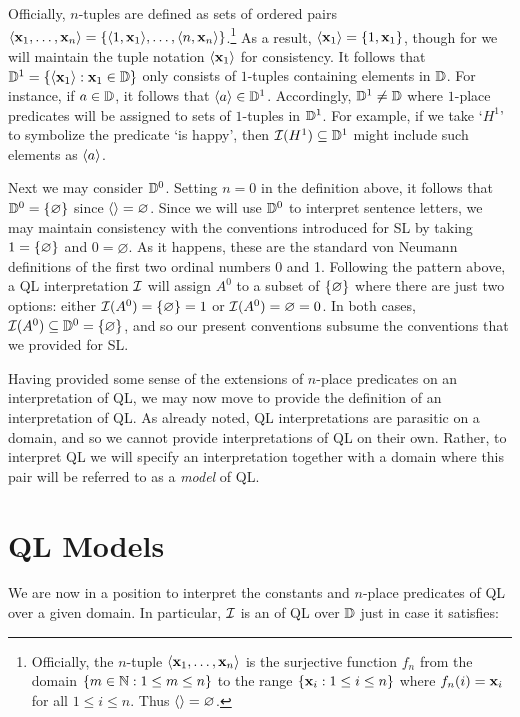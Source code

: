 Officially, $n$-tuples are defined as sets of ordered pairs $\langle\mathbf{x}_1,\ldots,\mathbf{x}_n\rangle=\lbrace\langle1,\mathbf{x}_1\rangle,\ldots,\langle n,\mathbf{x}_n\rangle\rbrace$.\footnote{Officially, the $n$-tuple $\langle\mathbf{x}_1,\ldots,\mathbf{x}_n\rangle$ is the surjective function $f_n$ from the domain $\lbrace m\in\mathbb{N}:1\leq m\leq n\rbrace$ to the range $\lbrace\mathbf{x}_i:1\leq i\leq n\rbrace$ where $f_n(i)=\mathbf{x}_i$ for all $1\leq i\leq n$. Thus $\langle\rangle=\varnothing$.}
As a result, $\langle\mathbf{x}_1\rangle=\lbrace1,\mathbf{x}_1\rbrace$, though for we will maintain the tuple notation $\langle\mathbf{x}_1\rangle$ for consistency.
It follows that $\mathbb{D}^1=\lbrace\langle\mathbf{x}_1\rangle:\mathbf{x}_1\in\mathbb{D}\rbrace$ only consists of $1$-tuples containing elements in $\mathbb{D}$.
For instance, if $a\in \mathbb{D}$, it follows that $\langle a\rangle\in\mathbb{D}^1$.
Accordingly, $\mathbb{D}^1\neq\mathbb{D}$ where $1$-place predicates will be assigned to sets of $1$-tuples in $\mathbb{D}^1$.
For example, if we take `$H^1$' to symbolize the predicate `is happy', then $\mathcal{I}(H^1)\subseteq\mathbb{D}^1$ might include such elements as $\langle a\rangle$.

Next we may consider $\mathbb{D}^0$. 
Setting $n=0$ in the definition above, it follows that $\mathbb{D}^0=\lbrace\varnothing\rbrace$ since $\langle\rangle=\varnothing$.
Since we will use $\mathbb{D}^0$ to interpret sentence letters, we may maintain consistency with the conventions introduced for SL by taking $1=\lbrace\varnothing\rbrace$ and $0=\varnothing$.
As it happens, these are the standard von Neumann definitions of the first two ordinal numbers 0 and 1.
Following the pattern above, a QL interpretation $\mathcal{I}$ will assign $A^0$ to a subset of $\lbrace\varnothing\rbrace$ where there are just two options: either $\mathcal{I}(A^0)=\lbrace\varnothing\rbrace=1$ or $\mathcal{I}(A^0)=\varnothing=0$.
In both cases, $\mathcal{I}(A^0)\subseteq\mathbb{D}^0=\lbrace\varnothing\rbrace$, and so our present conventions subsume the conventions that we provided for SL.

Having provided some sense of the extensions of $n$-place predicates on an interpretation of QL, we may now move to provide the definition of an interpretation of QL.
As already noted, QL interpretations are parasitic on a domain, and so we cannot provide interpretations of QL on their own.
Rather, to interpret QL we will specify an interpretation together with a domain where this pair will be referred to as a \textit{model} of QL.


\section{QL Models}
\label{ch9.ModelsQL}

We are now in a position to interpret the constants and $n$-place predicates of QL over a given domain.
In particular, $\mathcal{I}$ is an  of QL over $\mathbb{D}$ just in case it satisfies:

